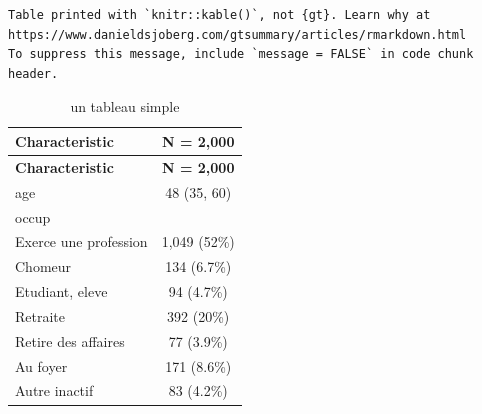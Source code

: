 \documentclass[
  letterpaper,
  DIV=11,
  numbers=noendperiod,
  oneside]{scrreprt}
\begin{document}
\begin{verbatim}
Table printed with `knitr::kable()`, not {gt}. Learn why at
https://www.danieldsjoberg.com/gtsummary/articles/rmarkdown.html
To suppress this message, include `message = FALSE` in code chunk header.
\end{verbatim}

\hypertarget{tbl-tableau-simple}{}
\begin{longtable}[]{@{}lc@{}}
\caption{\label{tbl-tableau-simple}un tableau simple}\tabularnewline
\toprule()
\textbf{Characteristic} & \textbf{N = 2,000} \\
\midrule()
\endfirsthead
\toprule()
\textbf{Characteristic} & \textbf{N = 2,000} \\
\midrule()
\endhead
age & 48 (35, 60) \\
occup & \\
Exerce une profession & 1,049 (52\%) \\
Chomeur & 134 (6.7\%) \\
Etudiant, eleve & 94 (4.7\%) \\
Retraite & 392 (20\%) \\
Retire des affaires & 77 (3.9\%) \\
Au foyer & 171 (8.6\%) \\
Autre inactif & 83 (4.2\%) \\
\bottomrule()
\end{longtable}
\end{document}
